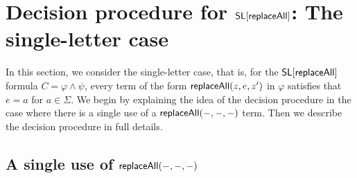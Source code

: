 

\section{Decision procedure for $\mathsf{SL}[\mathsf{replaceAll}]$: The single-letter case} \label{sec:replaceallsl}








In this section, we consider the single-letter case, that is, for the $\mathsf{SL}[\mathsf{replaceAll}]$ formula $C = \varphi \wedge \psi$, every term of the form $\mathsf{replaceAll}(z, e, z')$ in $\varphi$ satisfies that $e=a$ for $a \in \Sigma$.
We begin by explaining the idea of the decision procedure in the case where there is a single use of a $\mathsf{replaceAll}(-, - ,-)$ term.
Then we describe the decision procedure in full details.



\subsection{A single use of $\mathsf{replaceAll}(-, -, -)$}


